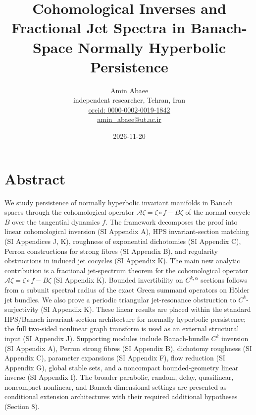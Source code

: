 \documentclass[11pt,a4paper]{article}
\title{Cohomological Inverses and Fractional Jet Spectra in Banach-Space Normally Hyperbolic Persistence}
\author{Amin Abaee \\ independent researcher, Tehran, Iran \\ \href{https://orcid.org/0000-0002-0019-1842}{orcid: 0000-0002-0019-1842} \\ \href{mailto:amin_abaee@ut.ac.ir}{amin\_abaee@ut.ac.ir}}
\date{2026-11-20}
\theoremstyle{plain}
\theoremstyle{definition}
\theoremstyle{remark}
\numberwithin{equation}{section}
\numberwithin{figure}{section}
\begin{document}
\maketitle

\section*{Abstract}

We study persistence of normally hyperbolic invariant manifolds in Banach spaces through the cohomological operator $\mathcal A\zeta=\zeta\circ f-B\zeta$ of the normal cocycle $B$ over the tangential dynamics $f$. The framework decomposes the proof into linear cohomological inversion (SI Appendix A), HPS invariant-section matching (SI Appendices J, K), roughness of exponential dichotomies (SI Appendix C), Perron constructions for strong fibres (SI Appendix B), and regularity obstructions in induced jet cocycles (SI Appendix K). The main new analytic contribution is a fractional jet-spectrum theorem for the cohomological operator $\mathcal A\zeta=\zeta\circ f-B\zeta$ (SI Appendix K). Bounded invertibility on $C^{k,\alpha}$ sections follows from a subunit spectral radius of the exact Green summand operators on Hölder jet bundles. We also prove a periodic triangular jet-resonance obstruction to $C^k$-surjectivity (SI Appendix K). These linear results are placed within the standard HPS/Banach invariant-section architecture for normally hyperbolic persistence; the full two-sided nonlinear graph transform is used as an external structural input (SI Appendix J). Supporting modules include Banach-bundle $C^k$ inversion (SI Appendix A), Perron strong fibres (SI Appendix B), dichotomy roughness (SI Appendix C), parameter expansions (SI Appendix F), flow reduction (SI Appendix G), global stable sets, and a noncompact bounded-geometry linear inverse (SI Appendix I). The broader parabolic, random, delay, quasilinear, noncompact nonlinear, and Banach-dimensional settings are presented as conditional extension architectures with their required additional hypotheses (Section 8).

\begin{center}
\end{center}
\end{document}
